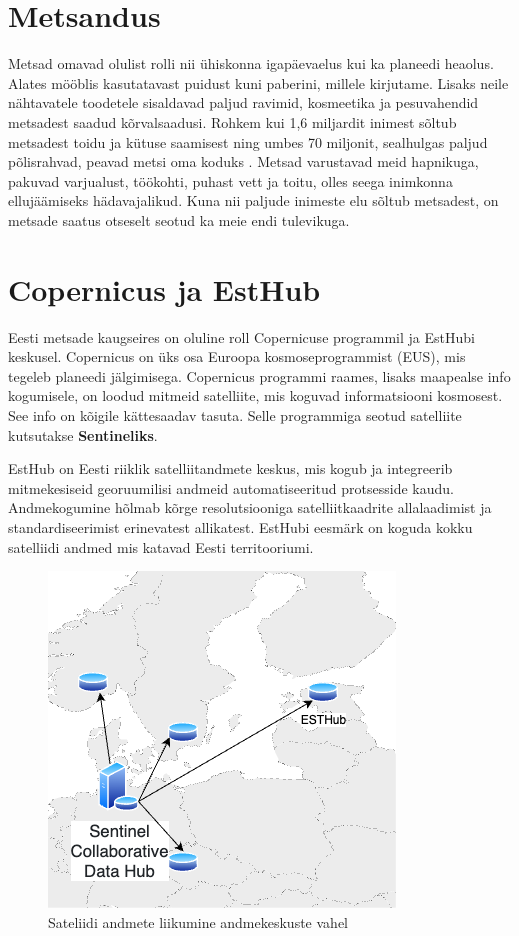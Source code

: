 \section{Metsandus}
Metsad omavad olulist rolli nii ühiskonna igapäevaelus kui ka planeedi heaolus.
Alates mööblis kasutatavast puidust kuni paberini, millele kirjutame. Lisaks neile
nähtavatele toodetele sisaldavad paljud ravimid, kosmeetika ja pesuvahendid
metsadest saadud kõrvalsaadusi. Rohkem kui 1,6 miljardit inimest sõltub
metsadest toidu ja kütuse saamisest ning umbes 70 miljonit, sealhulgas paljud
põlisrahvad, peavad metsi oma koduks \cite{karsentyUnderlyingCausesRapid2003}. 
Metsad varustavad meid hapnikuga, pakuvad
varjualust, töökohti, puhast vett ja toitu, olles seega inimkonna ellujäämiseks
hädavajalikud. Kuna nii paljude inimeste elu sõltub metsadest, on metsade saatus
otseselt seotud ka meie endi tulevikuga. \cite{WWFImportanceForests}

\section{Copernicus ja EstHub}
Eesti metsade kaugseires on oluline roll Copernicuse programmil ja EstHubi keskusel. Copernicus on üks osa Euroopa kosmoseprogrammist (EUS), mis tegeleb planeedi jälgimisega. Copernicus programmi raames, lisaks maapealse info kogumisele, on loodud mitmeid satelliite, mis koguvad informatsiooni kosmosest. See info on kõigile kättesaadav tasuta. Selle programmiga seotud satelliite kutsutakse \textbf{Sentineliks}. \cite{CopernicusCopernicus}


EstHub on Eesti riiklik satelliitandmete keskus, mis kogub ja integreerib
mitmekesiseid georuumilisi andmeid automatiseeritud protsesside kaudu.
Andmekogumine hõlmab kõrge resolutsiooniga satelliitkaadrite allalaadimist ja
standardiseerimist erinevatest allikatest. EstHubi eesmärk on koguda kokku satelliidi andmed mis katavad Eesti territooriumi. \cite{maa-ametNationalSatelliteData}

\begin{figure}[H]
    \centering
    \includegraphics[width=.3\textwidth]{figures/datahubEU.drawio.png}
    \caption{Sateliidi andmete liikumine andmekeskuste vahel}
    \label{fig:esthubliiklus}
\end{figure}



